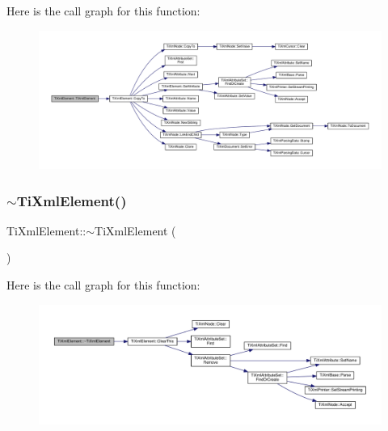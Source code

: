 Here is the call graph for this function\+:\nopagebreak
\begin{figure}[H]
\begin{center}
\leavevmode
\includegraphics[width=350pt]{class_ti_xml_element_a1ca4465f3c2eac6a60e641cd7f1d9f7e_cgraph}
\end{center}
\end{figure}
\mbox{\label{class_ti_xml_element_aa049a47c5081c0d021968666360da261}} 
\subsubsection{\texorpdfstring{$\sim$\+Ti\+Xml\+Element()}{~TiXmlElement()}}
{\footnotesize\ttfamily Ti\+Xml\+Element\+::$\sim$\+Ti\+Xml\+Element (\begin{DoxyParamCaption}{ }\end{DoxyParamCaption})\hspace{0.3cm}{\ttfamily [virtual]}}

Here is the call graph for this function\+:\nopagebreak
\begin{figure}[H]
\begin{center}
\leavevmode
\includegraphics[width=350pt]{class_ti_xml_element_aa049a47c5081c0d021968666360da261_cgraph}
\end{center}
\end{figure}


